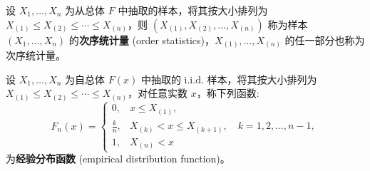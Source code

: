 \begin{definition} \label{def:order_statistics}
设 $X_1,\ldots,X_n$ 为从总体 $F$ 中抽取的样本，将其按大小排列为 $X_{(1)} \le X_{(2)} \le \cdots \le X_{(n)}$，则 $(X_{(1)}, X_{(2)}, \ldots, X_{(n)})$ 称为样本 $(X_1, \ldots, X_n)$ 的\textbf{次序统计量} (order statistics)，$X_{(1)}, \ldots, X_{(n)}$ 的任一部分也称为次序统计量。
\end{definition}

\begin{definition}[经验分布函数] \label{def:empirical_distribution_function}
设 $X_1,\ldots,X_n$ 为自总体 $F(x)$ 中抽取的 i.i.d. 样本，将其按大小排列为 $X_{(1)} \le X_{(2)} \le \cdots \le X_{(n)}$，对任意实数 $x$，称下列函数:
\begin{equation} \label{eq:empirical_distribution_function}
F_n(x)=
\begin{cases}
0, & x \le X_{(1)}, \\
\frac{k}{n}, & X_{(k)} < x \le X_{(k+1)}, \quad k=1,2,\ldots,n-1, \\
1, & X_{(n)} < x
\end{cases}
\end{equation}
为\textbf{经验分布函数} (empirical distribution function)。
\end{definition}

